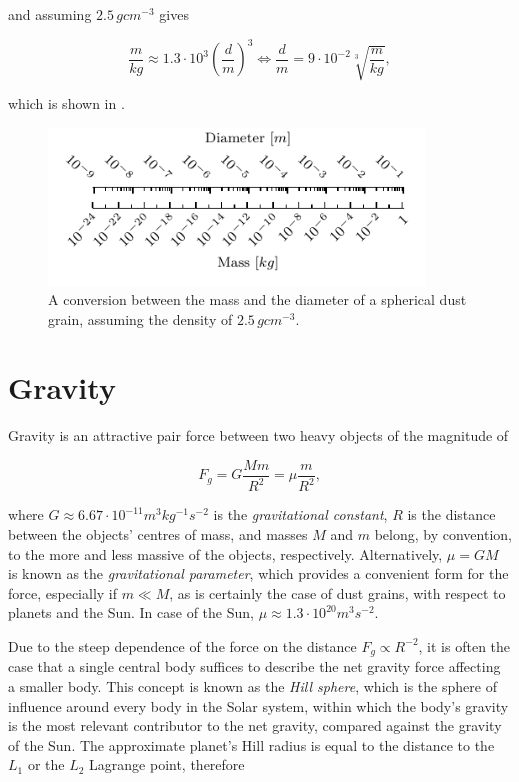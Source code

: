 and assuming $2.5 \, \si{g cm^{-3}}$ gives

\begin{equation}
    \frac{m}{\si{kg}} \approx 1.3 \cdot 10^3 \left(\frac{d}{\si{m}}\right)^3 
\Leftrightarrow 
    \frac{d}{\si{m}} = 9 \cdot 10^{-2} \sqrt[3]{\frac{m}{\si{kg}}},
\end{equation}

which is shown in .

\begin{figure}[h]
 	\centering
 	\includegraphics[width=10cm]{figures/mass_size_ruler.pdf}
 	\caption{A conversion between the mass and the diameter of a spherical dust grain, assuming the density of $2.5 \, \si{g cm^{-3}}$.}
 	\label{fig:mass_size_ruler}
\end{figure}

\section{Gravity} \label{ch:gravity}

Gravity is an attractive pair force between two heavy objects of the magnitude of 

\begin{equation}
    F_g = G \frac{M m}{R^2} = \mu \frac{m}{R^2},
\end{equation}

where $G \approx 6.67 \cdot 10^{-11} m^3 kg^{-1} s^{-2}$ is the \textit{gravitational constant}, $R$ is the distance between the objects' centres of mass, and masses $M$ and $m$ belong, by convention, to the more and less massive of the objects, respectively. Alternatively, $\mu = G M$ is known as the \textit{gravitational parameter}, which provides a convenient form for the force, especially if $m \ll M$, as is certainly the case of dust grains, with respect to planets and the Sun. In case of the Sun, $\mu \approx 1.3 \cdot 10^{20} \si{m^3 s^{-2}}$.

Due to the steep dependence of the force on the distance $F_g \propto R^{-2}$, it is often the case that a single central body suffices to describe the net gravity force affecting a smaller body. This concept is known as the \textit{Hill sphere}, which is the sphere of influence around every body in the Solar system, within which the body's gravity is the most relevant contributor to the net gravity, compared against the gravity of the Sun. The approximate planet's Hill radius is equal to the distance to the $L_1$ or the $L_2$ Lagrange point, therefore 

